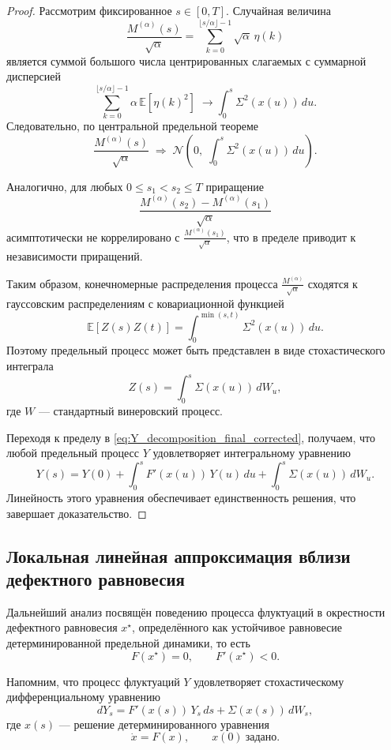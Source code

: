 \documentclass[12pt,a4paper]{article}
\theoremstyle{definition}
\begin{document}
\begin{proof}
Рассмотрим фиксированное $s\in[0,T]$.
Случайная величина
\[
\frac{M^{(\alpha)}(s)}{\sqrt{\alpha}}
=
\sum_{k=0}^{\lfloor s/\alpha \rfloor-1}
\sqrt{\alpha}\,\eta(k)
\]
является суммой большого числа центрированных слагаемых
с суммарной дисперсией
\[
\sum_{k=0}^{\lfloor s/\alpha \rfloor-1}
\alpha\,\mathbb E[\eta(k)^2]
\;\xrightarrow{\;}
\int_0^s \Sigma^2(x(u))\,du.
\]
Следовательно, по центральной предельной теореме
\[
\frac{M^{(\alpha)}(s)}{\sqrt{\alpha}}
\;\Longrightarrow\;
\mathcal N\!\left(0,\;\int_0^s \Sigma^2(x(u))\,du\right).
\]

Аналогично, для любых $0\le s_1< s_2\le T$
приращение
\[
\frac{M^{(\alpha)}(s_2)-M^{(\alpha)}(s_1)}{\sqrt{\alpha}}
\]
асимптотически не коррелировано
с $\frac{M^{(\alpha)}(s_1)}{\sqrt{\alpha}}$,
что в пределе приводит к независимости приращений.

Таким образом, конечномерные распределения процесса
$\frac{M^{(\alpha)}}{\sqrt{\alpha}}$
сходятся к гауссовским распределениям
с ковариационной функцией
\[
\mathbb E[Z(s)Z(t)]
=
\int_0^{\min(s,t)} \Sigma^2(x(u))\,du.
\]
Поэтому предельный процесс может быть представлен
в виде стохастического интеграла
\[
Z(s)=\int_0^s \Sigma(x(u))\,dW_u,
\]
где $W$ — стандартный винеровский процесс.


Переходя к пределу в \eqref{eq:Y_decomposition_final_corrected},
получаем, что любой предельный процесс $Y$
удовлетворяет интегральному уравнению
\[
Y(s)
=
Y(0)
+
\int_0^s F'(x(u))\,Y(u)\,du
+
\int_0^s \Sigma(x(u))\,dW_u.
\]
Линейность этого уравнения обеспечивает
единственность решения,
что завершает доказательство.

\end{proof}


\subsection{Локальная линейная аппроксимация вблизи дефектного равновесия}

Дальнейший анализ посвящён поведению процесса флуктуаций
в окрестности дефектного равновесия $x^\star$,
определённого как устойчивое равновесие
детерминированной предельной динамики,
то есть
\[
F(x^\star)=0,
\qquad
F'(x^\star)<0.
\]

Напомним, что процесс флуктуаций $Y$
удовлетворяет стохастическому дифференциальному уравнению
\[
dY_s
=
F'(x(s))\,Y_s\,ds
+
\Sigma(x(s))\,dW_s,
\]
где $x(s)$ — решение детерминированного уравнения
\[
\dot x = F(x),
\qquad
x(0)\ \text{задано}.
\]
\end{document}
